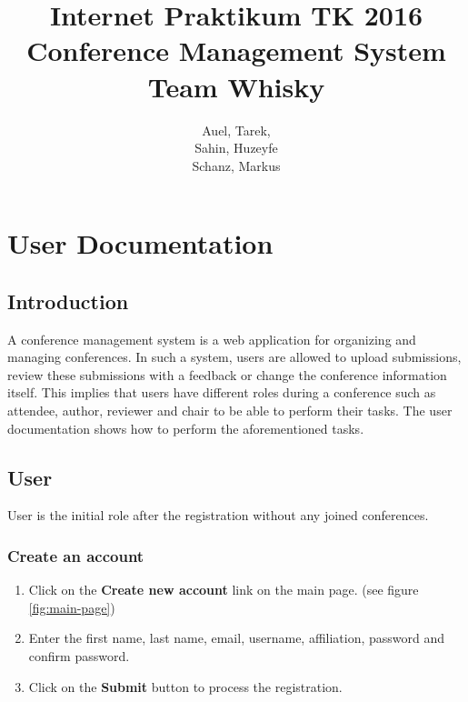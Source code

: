 \documentclass[nochapterpage,nopartpage,noheadingspace,numbersubsubsec,bigchapter,colorback,accentcolor=tud9c,10pt]{tudreport}
\title{Internet Praktikum TK 2016\\ Conference Management System\\ Team Whisky}
\subtitle{Auel, Tarek,\\ Sahin, Huzeyfe\\ Schanz, Markus}
\begin{document}
\maketitle
\tableofcontents


\part{User Documentation}
\label{part:user}

  \chapter{Introduction}
  \label{ch:user:intro}

A conference management system is a web application for organizing and managing conferences. In such a system, users are allowed to upload submissions, review these submissions with a feedback or change the conference information itself. This implies that users have different roles during a conference such as attendee, author, reviewer and chair to be able to perform their tasks. The user documentation shows how to perform the aforementioned tasks.

  \chapter{User}

User is the initial role after the registration without any joined conferences.

	\section{Create an account}


\begin{enumerate}
	\item	Click on the \textbf{Create new account} link on the main page. (see figure \ref{fig:main-page})
	\item	Enter the first name, last name, email, username, affiliation, password and confirm password.
	\item	Click on the \textbf{Submit} button to process the registration.
\end{enumerate}

\end{document}
